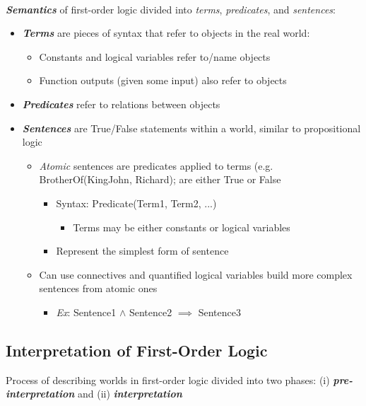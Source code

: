 \documentclass[12pt]{extarticle}
\theoremstyle{definition}
\theoremstyle{remark}
\newcommand{\pstart}[0]{\noindent}
\newcommand{\newp}[0]{~\\ \pstart}
\newcommand{\term}[1]{\noindent\textbf{\textit{#1}}}
\begin{document}
\newp
\term{Semantics} of first-order logic divided into \textit{terms}, \textit{predicates}, and \textit{sentences}: \begin{itemize}
    \item \term{Terms} are pieces of syntax that refer to objects in the real world: \begin{itemize}
        \item Constants and logical variables refer to/name objects
        \item Function outputs (given some input) also refer to objects
    \end{itemize}
    \item \term{Predicates} refer to relations between objects
    \item \term{Sentences} are True/False statements within a world, similar to propositional logic \begin{itemize}
        \item \textit{Atomic} sentences are predicates applied to terms (e.g. BrotherOf(KingJohn, Richard); are either True or False \begin{itemize}
            \item Syntax: Predicate(Term1, Term2, ...) \begin{itemize}
                \item Terms may be either constants or logical variables
            \end{itemize}
            \item Represent the simplest form of sentence
        \end{itemize}
        \item Can use connectives and quantified logical variables build more complex sentences from atomic ones \begin{itemize}
            \item \textit{Ex}: Sentence1 $\land$ Sentence2 $\implies$ Sentence3
        \end{itemize}
    \end{itemize}
\end{itemize}

\subsection{Interpretation of First-Order Logic}
Process of describing worlds in first-order logic divided into two phases: (i) \term{pre-interpretation} and (ii) \term{interpretation}
\end{document}
